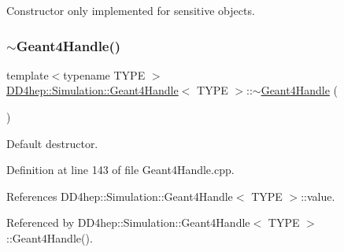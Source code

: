 Constructor only implemented for sensitive objects. 

\hypertarget{class_d_d4hep_1_1_simulation_1_1_geant4_handle_adfcf2edb6e30d0780f2a20a8be6f47b5}{}\label{class_d_d4hep_1_1_simulation_1_1_geant4_handle_adfcf2edb6e30d0780f2a20a8be6f47b5} 
\subsubsection{\texorpdfstring{$\sim$\+Geant4\+Handle()}{~Geant4Handle()}}
{\footnotesize\ttfamily template$<$typename T\+Y\+PE $>$ \\
\hyperlink{class_d_d4hep_1_1_simulation_1_1_geant4_handle}{D\+D4hep\+::\+Simulation\+::\+Geant4\+Handle}$<$ T\+Y\+PE $>$\+::$\sim$\hyperlink{class_d_d4hep_1_1_simulation_1_1_geant4_handle}{Geant4\+Handle} (\begin{DoxyParamCaption}{ }\end{DoxyParamCaption})}



Default destructor. 



Definition at line 143 of file Geant4\+Handle.\+cpp.



References D\+D4hep\+::\+Simulation\+::\+Geant4\+Handle$<$ T\+Y\+P\+E $>$\+::value.



Referenced by D\+D4hep\+::\+Simulation\+::\+Geant4\+Handle$<$ T\+Y\+P\+E $>$\+::\+Geant4\+Handle().

\hypertarget{class_d_d4hep_1_1_simulation_1_1_geant4_handle_a993b8c4a5557bdf6446bda3ec1dc2ceb}{}\label{class_d_d4hep_1_1_simulation_1_1_geant4_handle_a993b8c4a5557bdf6446bda3ec1dc2ceb} 
